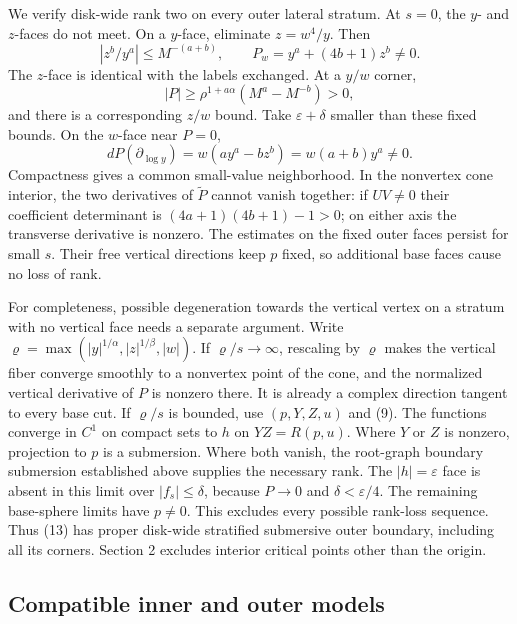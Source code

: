 \documentclass[11pt]{article}
\begin{document}
We verify disk-wide rank two on every outer lateral stratum.
At \(s=0\), the \(y\)- and \(z\)-faces do not meet. On a
\(y\)-face, eliminate \(z=w^4/y\). Then
\[
 |z^b/y^a|\le M^{-(a+b)},\qquad
 P_w=y^a+(4b+1)z^b\ne0.                            \tag{14}
\]
The \(z\)-face is identical with the labels exchanged.
At a \(y/w\) corner,
\[
 |P|\ge \rho^{1+a\alpha}(M^a-M^{-b})>0,             \tag{15}
\]
and there is a corresponding \(z/w\) bound.
Take \(\varepsilon+\delta\) smaller than these fixed bounds.
On the \(w\)-face near \(P=0\),
\[
 dP(\partial_{\log y})=w(ay^a-bz^b)
                      =w(a+b)y^a\ne0.             \tag{16}
\]
Compactness gives a common small-value neighborhood.
In the nonvertex cone interior, the two derivatives of
\(\widetilde P\) cannot vanish together: if \(UV\ne0\) their
coefficient determinant is
\((4a+1)(4b+1)-1>0\); on either axis the transverse
derivative is nonzero.
The estimates on the fixed outer faces persist for small \(s\).
Their free vertical directions keep \(p\) fixed, so additional
base faces cause no loss of rank.

For completeness, possible degeneration towards the vertical
vertex on a stratum with no vertical face needs a separate argument.
Write
\(\varrho=\max(|y|^{1/\alpha},|z|^{1/\beta},|w|)\).
If \(\varrho/s\to\infty\), rescaling by \(\varrho\)
makes the vertical fiber converge smoothly to a nonvertex
point of the cone, and the normalized vertical derivative of \(P\)
is nonzero there. It is already a complex direction tangent
to every base cut. If \(\varrho/s\) is bounded, use
\((p,Y,Z,u)\) and (9). The functions converge in \(C^1\)
on compact sets to \(h\) on \(YZ=R(p,u)\).
Where \(Y\) or \(Z\) is nonzero, projection to \(p\)
is a submersion. Where both vanish, the root-graph boundary
submersion established above supplies the necessary rank.
The \(|h|=\varepsilon\) face is absent in this limit over
\(|f_s|\le\delta\), because \(P\to0\) and \(\delta<\varepsilon/4\).
The remaining base-sphere limits have \(p\ne0\).
This excludes every possible rank-loss sequence.
Thus (13) has proper disk-wide stratified submersive outer
boundary, including all its corners. Section 2 excludes interior
critical points other than the origin.

\subsection{Compatible inner and outer models}
\end{document}
